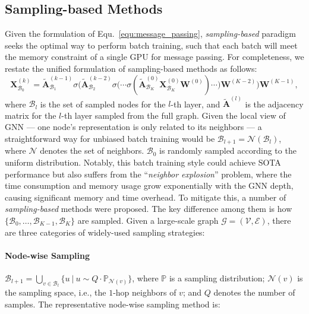 \message{ !name(main.tex)}\documentclass{article}
\newcommand{\bm}[1]{\mathbf{#1}}
\begin{document}
\subsection{Sampling-based Methods}\label{sec:formu_sampling}
\vspace{-2mm}
Given the formulation of Equ.~\eqref{equ:message_passing}, \textit{sampling-based} paradigm seeks the optimal way to perform batch training, such that each batch will meet the memory constraint of a single GPU for message passing. For completeness, we restate the unified formulation of sampling-based methods as follows:
\begin{equation}
	\bm{X}_{\mathcal{B}_{0}}^{(k)} = \widetilde{\bm{A}}_{\mathcal{B}_{1}}^{(k-1)}\sigma\bigg(\widetilde{\bm{A}}_{\mathcal{B}_{2}}^{(k-2)}\sigma\big(\cdots \sigma(\widetilde{\bm{A}}_{\mathcal{B}_{K}}^{(0)}\bm{X}_{\mathcal{B}_{K}}^{(0)}\bm{W}^{(0)}) \cdots\big)\bm{W}^{(K-2)}\bigg)\bm{W}^{(K-1)},
\end{equation}
where $\mathcal{B}_{l}$ is the set of sampled nodes for the $l$-th layer, and \(\widetilde{\bm{A}}^{(l)}\) is the adjacency matrix for the \(l\)-th layer sampled from the full graph. Given the local view of GNN --- one node's representation is only related to its neighbors --- a straightforward way for unbiased batch training would be \(\mathcal{B}_{l+1}=\mathcal{N}(\mathcal{B}_l)\), where \(\mathcal{N}\) denotes the set of neighbors. \(\mathcal{B}_0\) is randomly sampled according to the uniform distribution. Notably, this batch training style could achieve SOTA performance but also suffers from the ``\textit{neighbor explosion}'' problem, where the time consumption and memory usage grow exponentially with the GNN depth, causing significant memory and time overhead. To mitigate this, a number of \textit{sampling-based} methods were proposed. The key difference among them is how $\{\mathcal{B}_0, \dots, \mathcal{B}_{K-1}, \mathcal{B}_{K}\}$ are sampled. Given a large-scale graph $\mathcal{G}=(\mathcal{V},\mathcal{E})$, there are three categories of widely-used sampling strategies:

\vspace{-2mm}
\paragraph{Node-wise Sampling~\cite{hamilton2017inductive}}\label{sec:node_wise_sampling.}
\(\mathcal{B}_{l+1} = \bigcup_{v \in \mathcal{B}_l} \{u \ |\ u \sim Q \cdot \mathbb{P}_{\mathcal{N}(v)}\}\), where \(\mathbb{P}\) is a sampling distribution; \(\mathcal{N}(v)\) is the sampling space, i.e., the \(1\)-hop neighbors of \(v\); and \(Q\) denotes the number of samples. The representative node-wise sampling method is:
\end{document}
